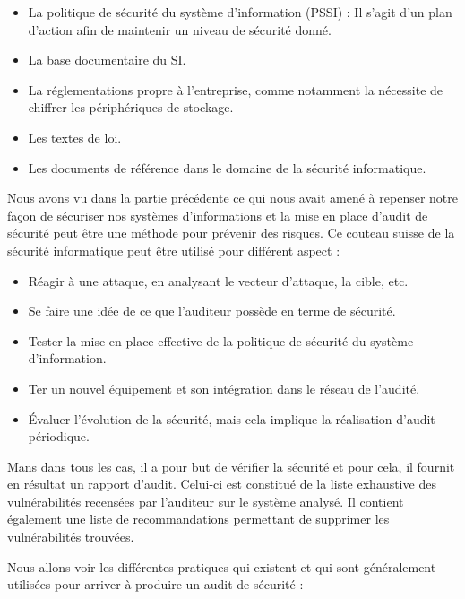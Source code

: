 \documentclass[a4paper]{memoir}
\begin{document}
\begin{itemize}
  \item La politique de sécurité du système d'information (PSSI) : Il s'agit d'un plan d'action afin de maintenir un niveau de sécurité donné.
  \item La base documentaire du SI.
  \item La réglementations propre à l'entreprise, comme notamment la nécessite de chiffrer les périphériques de stockage.
  \item Les textes de loi.
    \item Les documents de référence dans le domaine de la sécurité informatique.\\
\end{itemize}

Nous avons vu dans la partie précédente ce qui nous avait amené à repenser notre façon de sécuriser nos systèmes d'informations et la mise en place d'audit de sécurité peut être une méthode pour prévenir des risques. Ce couteau suisse de la sécurité informatique peut être utilisé pour différent aspect :

\begin{itemize}
\item Réagir à une attaque, en analysant le vecteur d'attaque, la cible, etc.
\item Se faire une idée de ce que l'auditeur possède en terme de sécurité.
\item Tester la mise en place effective de la politique de sécurité du système d'information.
\item Ter un nouvel équipement et son intégration dans le réseau de l'audité.
\item Évaluer l'évolution de la sécurité, mais cela implique la réalisation d'audit périodique.\\
\end{itemize}

Mans dans tous les cas, il a pour but de vérifier la sécurité et pour cela, il fournit en résultat un rapport d'audit. Celui-ci est constitué de la liste exhaustive des vulnérabilités recensées par l'auditeur sur le système analysé. Il contient également une liste de recommandations permettant de supprimer les vulnérabilités trouvées.

Nous allons voir les différentes pratiques qui existent et qui sont généralement utilisées pour arriver à produire un audit de sécurité :\\
\end{document}
